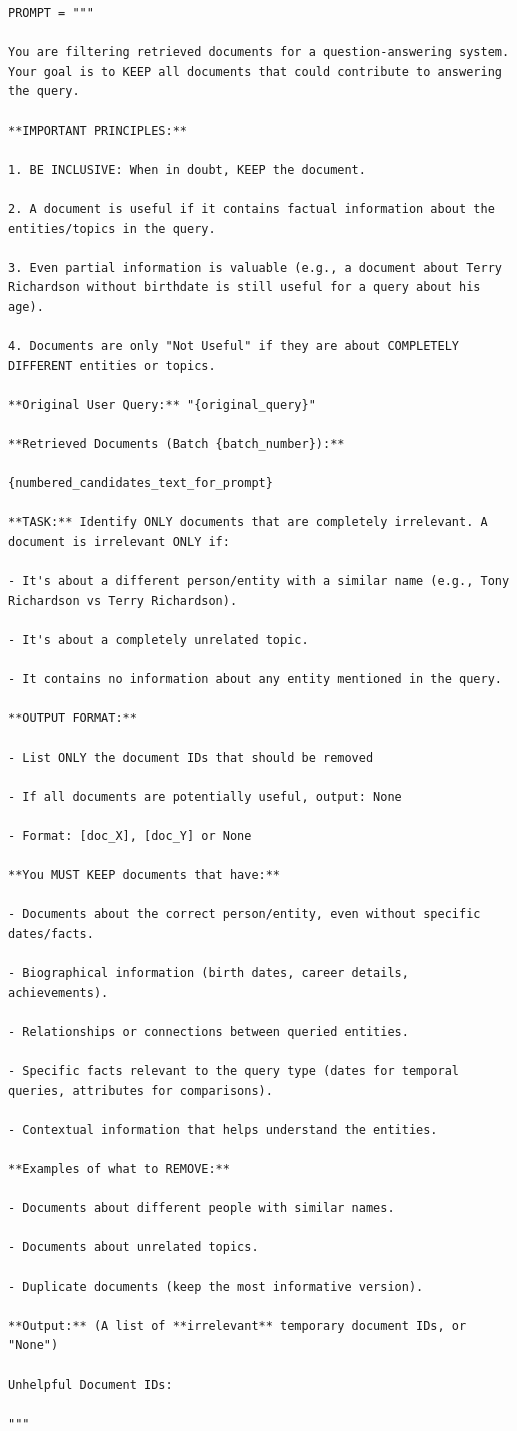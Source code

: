 \documentclass[11pt]{article}
\begin{document}
\begin{lstlisting}[basicstyle=\scriptsize\ttfamily]
PROMPT = """

You are filtering retrieved documents for a question-answering system. Your goal is to KEEP all documents that could contribute to answering the query.

**IMPORTANT PRINCIPLES:**

1. BE INCLUSIVE: When in doubt, KEEP the document.

2. A document is useful if it contains factual information about the entities/topics in the query.

3. Even partial information is valuable (e.g., a document about Terry Richardson without birthdate is still useful for a query about his age).

4. Documents are only "Not Useful" if they are about COMPLETELY DIFFERENT entities or topics.

**Original User Query:** "{original_query}"

**Retrieved Documents (Batch {batch_number}):**

{numbered_candidates_text_for_prompt}

**TASK:** Identify ONLY documents that are completely irrelevant. A document is irrelevant ONLY if:

- It's about a different person/entity with a similar name (e.g., Tony Richardson vs Terry Richardson).

- It's about a completely unrelated topic.

- It contains no information about any entity mentioned in the query.

**OUTPUT FORMAT:**

- List ONLY the document IDs that should be removed

- If all documents are potentially useful, output: None

- Format: [doc_X], [doc_Y] or None

**You MUST KEEP documents that have:**

- Documents about the correct person/entity, even without specific dates/facts.

- Biographical information (birth dates, career details, achievements).

- Relationships or connections between queried entities.

- Specific facts relevant to the query type (dates for temporal queries, attributes for comparisons).

- Contextual information that helps understand the entities.

**Examples of what to REMOVE:**

- Documents about different people with similar names.

- Documents about unrelated topics.

- Duplicate documents (keep the most informative version).

**Output:** (A list of **irrelevant** temporary document IDs, or "None")

Unhelpful Document IDs:

"""
\end{lstlisting}
\end{document}
